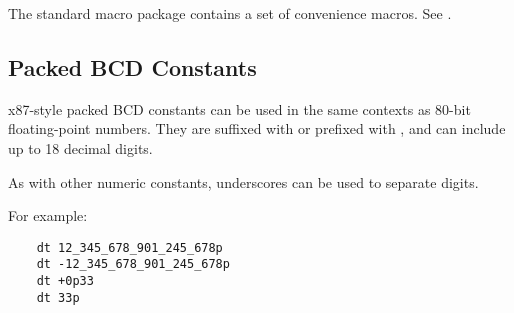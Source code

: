 The  standard macro package contains a set of convenience
macros. See .

\subsection{Packed BCD Constants}
\label{subsec:bcdconst}

x87-style packed BCD constants can be used in the same contexts as
80-bit floating-point numbers. They are suffixed with  or
prefixed with , and can include up to 18 decimal digits.

As with other numeric constants, underscores can be used
to separate digits.

For example:

\begin{lstlisting}
	dt 12_345_678_901_245_678p
	dt -12_345_678_901_245_678p
	dt +0p33
	dt 33p
\end{lstlisting}
